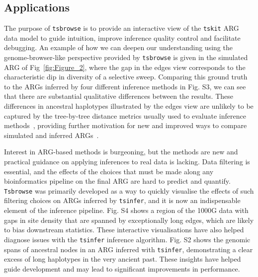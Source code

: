 \documentclass[unnumsec,webpdf,contemporary,large,namedate]{oup-authoring-template}%
\begin{document}

\subsection{Applications}
The purpose of \texttt{tsbrowse} is to provide an interactive view of the
\texttt{tskit} ARG data model to guide intuition, improve inference quality
control and facilitate debugging. An example of how we can deepen our understanding
using the genome-browser-like perspective provided by \texttt{tsbrowse}
is given in the simulated ARG of Fig~\ref{fig:Figure_2}, where
the gap in the edges view corresponds to the characteristic dip in diversity
of a selective sweep. Comparing this ground truth to the ARGs inferred
by four different inference methods in Fig. S3,
we can see that there are substantial qualitative differences between the
results. These differences in ancestral haplotypes illustrated by
the edges view are unlikely to be captured by the tree-by-tree distance
metrics usually used to evaluate
inference methods~\citep[e.g.][]{kelleher2019inferring,zhang2023biobank},
providing further motivation for new and improved ways to compare
simulated and inferred ARGs~\citep{fritze2024forest}.

Interest in ARG-based methods is burgeoning, but the methods are new
and practical guidance on applying inferences to real data is lacking.
Data filtering is essential, and the effects of the
choices that must be made along any bioinformatics pipeline on the final
ARG are hard to predict and quantify. \texttt{Tsbrowse} was primarily
developed as a way to quickly visualise the effects of such filtering
choices on ARGs inferred by \texttt{tsinfer}, and it is now an indispensable
element of the inference pipeline. Fig. S4
shows a region of the 1000G data with gaps in site density that are spanned by
 exceptionally long edges, which are likely to bias downstream statistics.
These interactive visualisations have also helped diagnose issues with
the \texttt{tsinfer} inference algorithm.
Fig. S2 shows the genomic spans of
ancestral nodes in an ARG inferred with \texttt{tsinfer}, demonstrating a clear
excess of long haplotypes in the very ancient past. These insights
have helped guide development and
may lead to significant improvements in performance.
\end{document}
